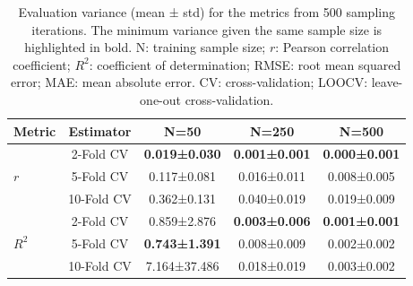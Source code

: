 \begin{table}[H]
    \caption{Evaluation variance (mean ± std) for the metrics from 500 sampling iterations. The minimum variance given the same sample size is highlighted in bold. N: training sample size; $r$: Pearson correlation coefficient; $R^2$: coefficient of determination; RMSE: root mean squared error; MAE: mean absolute error. CV: cross-validation; LOOCV: leave-one-out cross-validation.}
    \centering
    \begin{tabular}{lcccc}
        \toprule
        \textbf{Metric} & \textbf{Estimator} 
            & \textbf{N=50} & \textbf{N=250} & \textbf{N=500} \\
        \midrule
        \multirow{3}{*}{$r$}
            & 2-Fold CV
                & \textbf{0.019±0.030} 
                & \textbf{0.001±0.001}
                & \textbf{0.000±0.001} \\
            & 5-Fold CV
                & 0.117±0.081
                & 0.016±0.011
                & 0.008±0.005 \\
            & 10-Fold CV
                & 0.362±0.131
                & 0.040±0.019
                & 0.019±0.009 \\          
        \midrule
        \multirow{3}{*}{$R^2$}
            & 2-Fold CV
                & 0.859±2.876
                & \textbf{0.003±0.006}
                & \textbf{0.001±0.001} \\
            & 5-Fold CV
                & \textbf{0.743±1.391}
                & 0.008±0.009
                & 0.002±0.002 \\
            & 10-Fold CV
                & 7.164±37.486
                & 0.018±0.019
                & 0.003±0.002 \\
               

\end{tabular}
\end{table}
